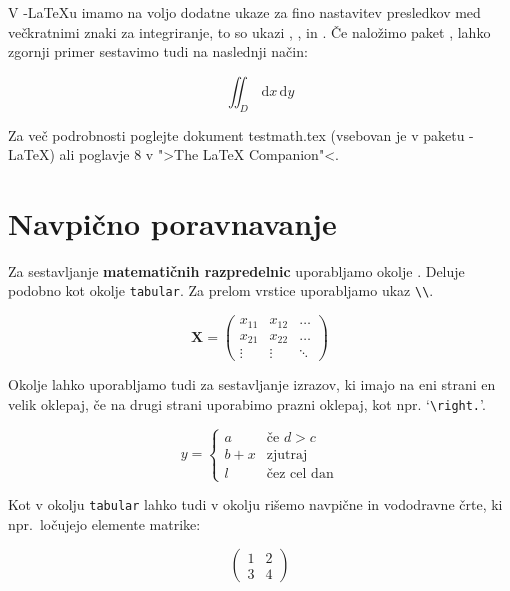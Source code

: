 V \AmS-\LaTeX{}u imamo na voljo dodatne ukaze za fino nastavitev presledkov med 
večkratnimi znaki za integriranje, to so ukazi
, ,  in .
Če naložimo paket , lahko zgornji primer sestavimo tudi na naslednji način:
\begin{example}
\newcommand{\ud}{\mathrm{d}}
\begin{displaymath}
\iint_{D} \, \ud x \, \ud y
\end{displaymath}
\end{example}

Za več podrobnosti poglejte dokument testmath.tex (vsebovan je v paketu 
\AmS-\LaTeX) ali poglavje 8 v ">The LaTeX Companion"<.

\section{Navpično poravnavanje}
\label{sec:vert}

Za sestavljanje \textbf{matematičnih razpredelnic} uporabljamo okolje . Deluje podobno
kot okolje \texttt{tabular}. Za prelom vrstice uporabljamo ukaz \verb|\\|.
\begin{example}
\begin{displaymath}
\mathbf{X} =
\left( \begin{array}{ccc}
x_{11} & x_{12} & \ldots \\
x_{21} & x_{22} & \ldots \\
\vdots & \vdots & \ddots
\end{array} \right)
\end{displaymath}
\end{example}

Okolje  lahko uporabljamo tudi za sestavljanje izrazov,
ki imajo na eni strani en velik oklepaj, če na drugi strani uporabimo prazni oklepaj, kot 
npr. `\verb|\right.|'.
\begin{example}
\begin{displaymath}
y = \left\{ \begin{array}{ll}
 a & \textrm{če $d>c$}\\
 b+x & \textrm{zjutraj}\\
 l & \textrm{čez cel dan}
  \end{array} \right.
\end{displaymath}
\end{example}


Kot v okolju \verb|tabular| lahko tudi v okolju 
rišemo navpične in vododravne črte, ki npr.~ločujejo elemente matrike:
\begin{example}
\begin{displaymath}
\left(\begin{array}{c|c}
 1 & 2 \\
\hline
3 & 4
\end{array}\right)
\end{displaymath}
\end{example}




